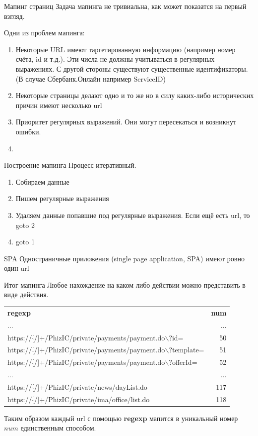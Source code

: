 \begin{frame}{Мапинг страниц}
	Задача мапинга не тривиальна, как может показатся на первый взгляд.
	
	Одни из проблем мапинга:
	\begin{enumerate}
		\item Некоторые URL имеют таргетированную информацию (например номер счёта, id и т.д.).
		Эти числа не должны учитываться в регулярных выражениях.
		С другой стороны существуют существенные идентификаторы. 
		(В случае Сбербанк.Онлайн например ServiceID)
		\item Некоторые страницы делают одно и то же но в силу каких-либо исторических причин 
		имеют несколько url
		\item Приоритет регулярных выражений. Они могут пересекаться и возникнут ошибки.
		\item {}
	\end{enumerate}
\end{frame}

\begin{frame}{Построение мапинга}
	Процесс итеративный.
	\begin{enumerate}
		\item Собираем данные
		\item Пишем регулярные выражения
		\item Удаляем данные попавшие под регулярные выражения. Если ещё есть url, то goto 2
		\item goto 1
	\end{enumerate}
\end{frame}

\begin{frame}{SPA}
	Одностраничные приложения (single page application, SPA)
	имеют ровно один url
	
\end{frame}


\begin{frame}{Итог мапинга}
	\small
	Любое нахождение на каком либо действии можно представить в виде действия.
	
	\begin{tabular}{lr}
		\textbf{regexp} & \textbf{num} \\
		... & ... \\
		https://[$\hat{}$/]+/PhizIC/private/payments/payment.do$\backslash$?id= & 50 \\
		https://[$\hat{}$/]+/PhizIC/private/payments/payment.do$\backslash$?template= & 51 \\
		https://[$\hat{}$/]+/PhizIC/private/payments/payment.do$\backslash$?offerId= & 52 \\
		... & ... \\
		https://[$\hat{}$/]+/PhizIC/private/news/dayList.do & 117 \\
		https://[$\hat{}$/]+/PhizIC/private/ima/office/list.do & 118 \\
	\end{tabular}
	
	Таким образом каждый url с помощью \textbf{regexp} мапится в уникальный 
	номер $num$ единственным способом. 
\end{frame}

